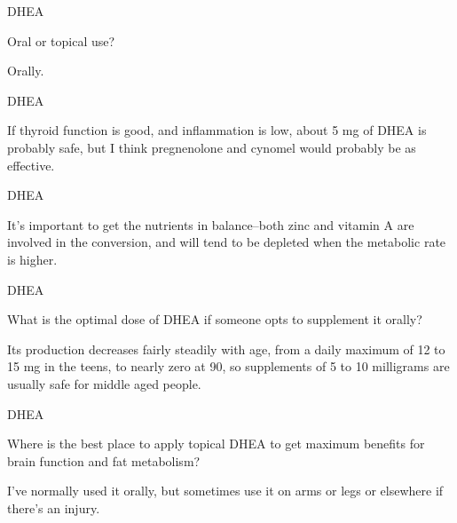 \documentclass[11pt,oneside,openany,extrafontsizes]{memoir}
\begin{document}
\begin{qaexchange}{DHEA}

    \begin{question}
        Oral or topical use?
    \end{question}

    \begin{answer}
        Orally.
    \end{answer}
\end{qaexchange}

\begin{standalonequote}{DHEA}

    \begin{answer}
        If thyroid function is good, and inflammation is low, about 5 mg of DHEA is probably safe, but I think pregnenolone and cynomel would probably be as effective.
    \end{answer}
\end{standalonequote}

\begin{standalonequote}{DHEA}

    \begin{answer}
      It's important to get the nutrients in balance--both zinc and vitamin A are involved in the conversion, and will tend to be depleted when the metabolic rate is higher.
    \end{answer}
\end{standalonequote}

\begin{qaexchange}{DHEA}

    \begin{question}
        What is the optimal dose of DHEA if someone opts to supplement it orally?
    \end{question}

    \begin{answer}
      Its production decreases fairly steadily with age, from a daily maximum of 12 to 15 mg in the teens, to nearly zero at 90, so supplements of 5 to 10 milligrams are usually safe for middle aged people.
    \end{answer}
\end{qaexchange}

\begin{qaexchange}{DHEA}

    \begin{question}
        Where is the best place to apply topical DHEA to get maximum benefits for brain function and fat metabolism?
    \end{question}

    \begin{answer}
       I've normally used it orally, but sometimes use it on arms or legs or elsewhere if there's an injury. 
    \end{answer}
\end{qaexchange}
\end{document}

